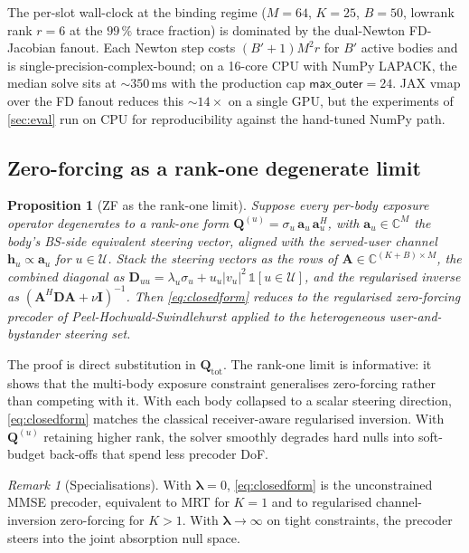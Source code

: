 \documentclass[journal,twocolumn,10pt]{IEEEtran}
\theoremstyle{plain}
\newtheorem{proposition}[theorem]{Proposition}
\theoremstyle{remark}
\newtheorem{remark}[theorem]{Remark}
\newcommand{\hh}{\mathbf{h}}
\newcommand{\Qmat}{\mathbf{Q}}
\newcommand{\Complex}{\mathbb{C}}
\newcommand{\Served}{\mathcal{U}}
\begin{document}
The per-slot wall-clock at the binding regime ($M = 64$, $K = 25$,
$B = 50$, lowrank rank $r = 6$ at the $99\,\%$ trace fraction) is
dominated by the dual-Newton FD-Jacobian fanout. Each Newton step
costs $(B' + 1) M^2 r$ for $B'$ active bodies and is
single-precision-complex-bound; on a 16-core CPU with NumPy LAPACK,
the median solve sits at $\sim 350\,$ms with the production cap
$\textsf{max\_outer} = 24$. JAX vmap over the FD fanout reduces
this $\sim 14\times$ on a single GPU, but the experiments of
\cref{sec:eval} run on CPU for reproducibility against the
hand-tuned NumPy path.

\subsection{Zero-forcing as a rank-one degenerate limit}\label{sec:zf-limit}

\begin{proposition}[ZF as the rank-one limit]\label{prop:ZFlimit}
Suppose every per-body exposure operator degenerates to a rank-one
form $\Qmat^{(u)} = \sigma_u\,\mathbf{a}_u\,\mathbf{a}_u^H$, with
$\mathbf{a}_u \in \Complex^M$ the body's BS-side equivalent steering
vector, aligned with the served-user channel
$\hh_u \propto \mathbf{a}_u$ for $u \in \Served$. Stack the
steering vectors as the rows of $\mathbf{A} \in \Complex^{(K+B)
\times M}$, the combined diagonal as $\mathbf{D}_{uu} = \lambda_u
\sigma_u + u_u |v_u|^2\,\mathbb{1}[u \in \Served]$, and the
regularised inverse as $(\mathbf{A}^H \mathbf{D} \mathbf{A} + \nu
\mathbf{I})^{-1}$. Then \cref{eq:closedform} reduces to the
regularised zero-forcing precoder of Peel-Hochwald-Swindlehurst
\cite{PeelHochwald2005} applied to the heterogeneous
user-and-bystander steering set.
\end{proposition}

The proof is direct substitution in
$\Qmat_{\mathrm{tot}}$. The rank-one limit is informative: it shows
that the multi-body exposure constraint generalises zero-forcing
rather than competing with it. With each body collapsed to a scalar
steering direction, \cref{eq:closedform} matches the classical
receiver-aware regularised inversion. With $\Qmat^{(u)}$ retaining
higher rank, the solver smoothly degrades hard nulls into
soft-budget back-offs that spend less precoder DoF.

\begin{remark}[Specialisations]\label{rem:limits}
With $\bm\lambda = 0$, \cref{eq:closedform} is the unconstrained
MMSE precoder, equivalent to MRT for $K = 1$ and to regularised
channel-inversion zero-forcing for $K > 1$. With $\bm\lambda \to
\infty$ on tight constraints, the precoder steers into the joint
absorption null space.
\end{remark}
\end{document}
